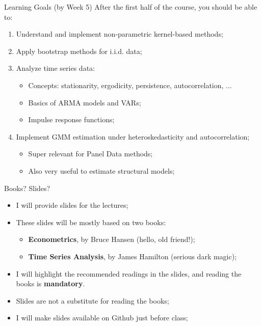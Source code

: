 \documentclass[aspectratio=169, xcolor=dvipsnames, 12pt]{beamer}
\begin{document}
\begin{frame}{Learning Goals (by Week 5)}
  After the first half of the course, you should be able to:

  \begin{enumerate}\itemsep1em
    \item Understand and implement non-parametric kernel-based methods;
    \item Apply bootstrap methods for i.i.d. data;
    \item Analyze time series data:
      \begin{itemize}
        \item Concepts: stationarity, ergodicity, persistence, autocorrelation, ...
        \item Basics of ARMA models and VARs;
        \item Impulse response functions;
      \end{itemize}
    \item Implement GMM estimation under heteroskedasticity and autocorrelation;
    \begin{itemize}
      \item Super relevant for Panel Data methods;
      \item Also very useful to estimate structural models;
    \end{itemize}
  \end{enumerate}
\end{frame}

\begin{frame}{Books? Slides?}
  \begin{itemize}\itemsep1em
    \item I will provide slides for the lectures;
    \item These slides will be mostly based on two books:
      \begin{itemize}
        \item \textbf{Econometrics}, by Bruce Hansen (hello, old friend!);
        \item \textbf{Time Series Analysis}, by James Hamilton (serious dark magic);
      \end{itemize}
    \item I will highlight the recommended readings in the slides, and reading the books is \textbf{mandatory}.
    \item Slides are not a substitute for reading the books;
    \item I will make slides available on Github just before class;
  \end{itemize}
\end{frame}
\end{document}
